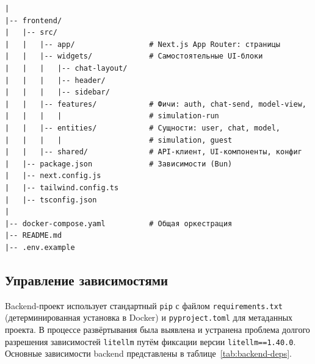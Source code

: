 \begin{lstlisting}[caption={Структура директорий проекта sdCloud (актуальная версия)}, label={lst:project-tree}, language={}, basicstyle=\ttfamily\scriptsize]
|
|-- frontend/
|   |-- src/
|   |   |-- app/                 # Next.js App Router: страницы
|   |   |-- widgets/             # Самостоятельные UI-блоки
|   |   |   |-- chat-layout/
|   |   |   |-- header/
|   |   |   |-- sidebar/
|   |   |-- features/            # Фичи: auth, chat-send, model-view,
|   |   |   |                    # simulation-run
|   |   |-- entities/            # Сущности: user, chat, model,
|   |   |   |                    # simulation, guest
|   |   |-- shared/              # API-клиент, UI-компоненты, конфиг
|   |-- package.json             # Зависимости (Bun)
|   |-- next.config.js
|   |-- tailwind.config.ts
|   |-- tsconfig.json
|
|-- docker-compose.yaml          # Общая оркестрация
|-- README.md
|-- .env.example
\end{lstlisting}

\subsection{Управление зависимостями}

Backend-проект использует стандартный \texttt{pip} с файлом \texttt{requirements.txt} (детерминированная установка в Docker) и \texttt{pyproject.toml} для метаданных проекта. В процессе развёртывания была выявлена и устранена проблема долгого разрешения зависимостей \texttt{litellm} путём фиксации версии \texttt{litellm==1.40.0}. Основные зависимости backend представлены в таблице~\ref{tab:backend-deps}.

